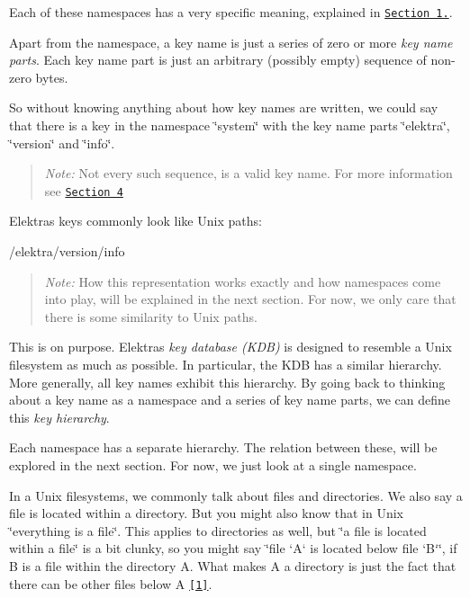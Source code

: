 Each of these namespaces has a very specific meaning, explained in \href{#12-namespaces-and-root-keys}{\tt Section 1.}.

Apart from the namespace, a key name is just a series of zero or more {\itshape key name parts}. Each key name part is just an arbitrary (possibly empty) sequence of non-\/zero bytes.

So without knowing anything about how key names are written, we could say that there is a key in the namespace \char`\"{}system\char`\"{} with the key name parts \char`\"{}elektra\char`\"{}, \char`\"{}version\char`\"{} and \char`\"{}info\char`\"{}.

\begin{quote}
{\itshape Note\+:} Not every such sequence, is a valid key name. For more information see \href{#4-valid-and-invalid-key-names}{\tt Section 4} \end{quote}


Elektra\textquotesingle{}s keys commonly look like Unix paths\+:


\begin{DoxyCode}
/elektra/version/info
\end{DoxyCode}


\begin{quote}
{\itshape Note\+:} How this representation works exactly and how namespaces come into play, will be explained in the next section. For now, we only care that there is some similarity to Unix paths. \end{quote}


This is on purpose. Elektra\textquotesingle{}s {\itshape key database (K\+DB)} is designed to resemble a Unix filesystem as much as possible. In particular, the K\+DB has a similar hierarchy. More generally, all key names exhibit this hierarchy. By going back to thinking about a key name as a namespace and a series of key name parts, we can define this {\itshape key hierarchy}.

Each namespace has a separate hierarchy. The relation between these, will be explored in the next section. For now, we just look at a single namespace.

In a Unix filesystems, we commonly talk about files and directories. We also say a file is located within a directory. But you might also know that in Unix \char`\"{}everything is a file\char`\"{}. This applies to directories as well, but \char`\"{}a file is located within a file\char`\"{} is a bit clunky, so you might say \char`\"{}file `\+A` is located below file `\+B`\char`\"{}, if {\ttfamily B} is a file within the directory {\ttfamily A}. What makes {\ttfamily A} a directory is just the fact that there can be other files below {\ttfamily A} \href{#footnote-1}{\tt \mbox{[}1\mbox{]}}. 


